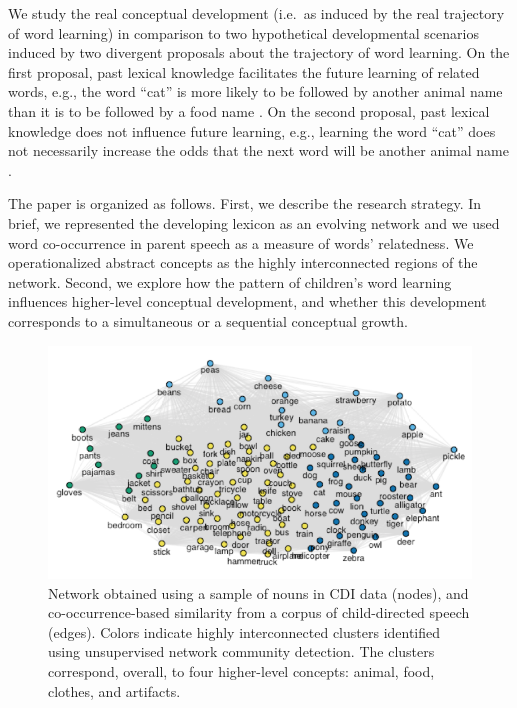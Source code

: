 \documentclass[11pt]{article}
\newenvironment{CodeChunk}{}{}
\begin{document}
We study the real conceptual development (i.e.~as induced by the real
trajectory of word learning) in comparison to two hypothetical
developmental scenarios induced by two divergent proposals about the
trajectory of word learning. On the first proposal, past lexical
knowledge facilitates the future learning of related words, e.g., the
word ``cat'' is more likely to be followed by another animal name than
it is to be followed by a food name \cite{steyvers2005,borovsky2016}. On
the second proposal, past lexical knowledge does not influence future
learning, e.g., learning the word ``cat'' does not necessarily increase
the odds that the next word will be another animal name
\cite{hills2009,sizemore2018}.

The paper is organized as follows. First, we describe the research
strategy. In brief, we represented the developing lexicon as an evolving
network and we used word co-occurrence in parent speech as a measure of
words' relatedness. We operationalized abstract concepts as the highly
interconnected regions of the network. Second, we explore how the
pattern of children's word learning influences higher-level conceptual
development, and whether this development corresponds to a simultaneous
or a sequential conceptual growth.

\begin{CodeChunk}
\captionsetup{width=0.8\textwidth}\begin{figure}[h]

{\centering \includegraphics{figs/network-1} 

}

\caption[Network obtained using a sample of nouns in CDI data (nodes), and co-occurrence-based similarity from a corpus of child-directed speech (edges)]{Network obtained using a sample of nouns in CDI data (nodes), and co-occurrence-based similarity from a corpus of child-directed speech (edges). Colors indicate highly interconnected clusters identified using unsupervised network community detection. The clusters correspond, overall, to four higher-level concepts: animal, food, clothes, and artifacts.}\label{fig:network}
\end{figure}
\end{CodeChunk}
\end{document}
